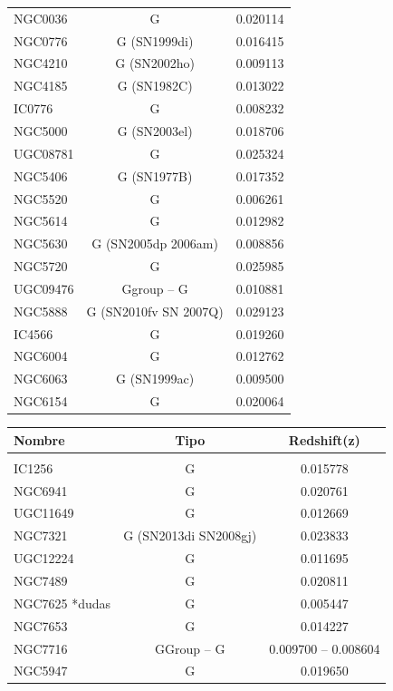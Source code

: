\documentclass[9pt]{revtex4-1}
\begin{document}
\begin{center}
\begin{tabular}{ l c c }
 NGC0036 & G & 0.020114 \\
 NGC0776 & G (SN1999di) & 0.016415 \\
 NGC4210 & G (SN2002ho) & 0.009113 \\
 NGC4185 & G (SN1982C)  & 0.013022 \\
 IC0776  & G & 0.008232 \\
 NGC5000 & G (SN2003el) & 0.018706 \\
 UGC08781 & G & 0.025324 \\
 NGC5406 & G (SN1977B) & 0.017352 \\
 NGC5520 & G & 0.006261 \\
 NGC5614 & G & 0.012982 \\
 NGC5630 & G (SN2005dp 2006am) & 0.008856 \\
 NGC5720 & G & 0.025985 \\
 UGC09476 & Ggroup -- G & 0.010881 \\
 NGC5888 & G (SN2010fv SN 2007Q) & 0.029123 \\
 IC4566 & G & 0.019260 \\
 NGC6004 & G & 0.012762 \\
 NGC6063 & G (SN1999ac) & 0.009500 \\
 NGC6154 & G & 0.020064 \\
 
 \end{tabular}
 \end{center}
 
 \begin{center}
 \begin{tabular}{ l c c }
 Nombre & Tipo & Redshift(z)\\
 \hline 
 \hline \\
 
 IC1256 & G & 0.015778 \\
 NGC6941 & G & 0.020761 \\
 UGC11649 & G & 0.012669 \\
 NGC7321 & G (SN2013di SN2008gj) & 0.023833 \\
 UGC12224 & G & 0.011695 \\
 NGC7489 & G & 0.020811 \\
 NGC7625 *dudas & G & 0.005447 \\
 NGC7653 & G & 0.014227 \\
 NGC7716 & GGroup -- G & 0.009700 -- 0.008604 \\
 NGC5947 & G & 0.019650 \\ 
 
 \end{tabular}
 \end{center}
\end{document}
